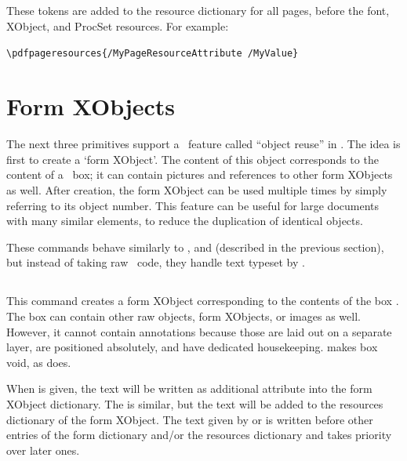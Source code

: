 \documentclass{pdftexmanual}
\begin{document}
\subsection{}

These tokens are added to the resource dictionary for all pages, before
the font, XObject, and ProcSet resources. For example:

\begin{verbatim}
\pdfpageresources{/MyPageResourceAttribute /MyValue}
\end{verbatim}

\section{Form XObjects}

The next three primitives support a \PDF\ feature called ``object
reuse'' in \PDFTEX. The idea is first to create a `form XObject'. The
content of this object corresponds to the content of a \TEX\ box; it can
contain pictures and references to other form XObjects as well. After
creation, the form XObject can be used multiple times by simply
referring to its object number. This feature can be useful for large
documents with many similar elements, to reduce the duplication of
identical objects.

These commands behave similarly to ,  and
 (described in the previous section), but instead of
taking raw \PDF\ code, they handle text typeset by \TEX.

\subsection{}

This command creates a form XObject corresponding to the contents of the
box . The box can contain other raw objects, form
XObjects, or images as well. However, it cannot contain annotations
because those are laid out on a separate layer, are positioned
absolutely, and have dedicated housekeeping.  makes box
 void, as  does.

When  is given, the text will be written
as additional attribute into the form XObject dictionary. The
 is similar, but the text will be added
to the resources dictionary of the form XObject. The text given by
 or  is written before
other entries of the form dictionary and\slash or the resources dictionary
and takes priority over later ones.
\end{document}
